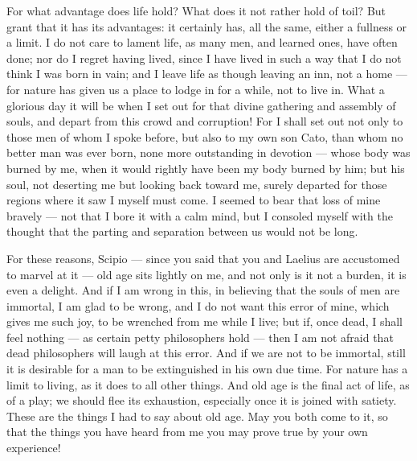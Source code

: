  For what advantage does life hold? What does it not rather hold of toil? But grant that it has its advantages: it certainly has, all the same, either a fullness or a limit. I do not care to lament life, as many men, and learned ones, have often done; nor do I regret having lived, since I have lived in such a way that I do not think I was born in vain; and I leave life as though leaving an inn, not a home — for nature has given us a place to lodge in for a while, not to live in. What a glorious day it will be when I set out for that divine gathering and assembly of souls, and depart from this crowd and corruption! For I shall set out not only to those men of whom I spoke before, but also to my own son Cato, than whom no better man was ever born, none more outstanding in devotion — whose body was burned by me, when it would rightly have been my body burned by him; but his soul, not deserting me but looking back toward me, surely departed for those regions where it saw I myself must come. I seemed to bear that loss of mine bravely — not that I bore it with a calm mind, but I consoled myself with the thought that the parting and separation between us would not be long.

 For these reasons, Scipio — since you said that you and Laelius are accustomed to marvel at it — old age sits lightly on me, and not only is it not a burden, it is even a delight. And if I am wrong in this, in believing that the souls of men are immortal, I am glad to be wrong, and I do not want this error of mine, which gives me such joy, to be wrenched from me while I live; but if, once dead, I shall feel nothing — as certain petty philosophers hold — then I am not afraid that dead philosophers will laugh at this error. And if we are not to be immortal, still it is desirable for a man to be extinguished in his own due time. For nature has a limit to living, as it does to all other things. And old age is the final act of life, as of a play; we should flee its exhaustion, especially once it is joined with satiety. These are the things I had to say about old age. May you both come to it, so that the things you have heard from me you may prove true by your own experience!
